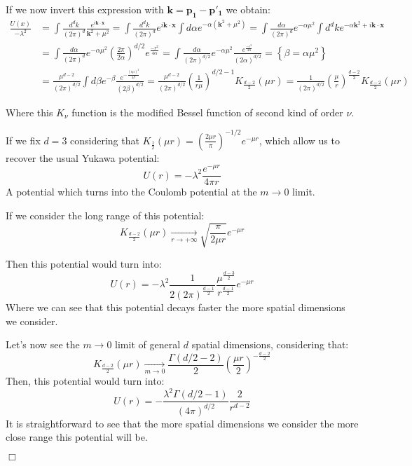 \documentclass[12pt]{article}
\newcommand{\qedwhite}{\hfill \ensuremath{\Box}}
\begin{document}
If we now invert this expression with $\mathbf{k}=\mathbf{p_1}-\mathbf{p'_1}$ we obtain:
\[
    \begin{aligned}
        \frac{U(x)}{-\lambda^2} &= \int \frac{d^dk}{(2\pi)^d}\frac{e^{i\mathbf{k}\cdot\mathbf{x}}}{\mathbf{k}^2+\mu^2} = \int \frac{d^dk}{(2\pi)^d} e^{i\mathbf{k}\cdot\mathbf{x}}\int d\alpha e^{-\alpha(\mathbf{k}^2+\mu^2)} = \int \frac{d\alpha}{(2\pi)^d}e^{-\alpha\mu^2}\int d^dk e^{-\alpha\mathbf{k}^2+i\mathbf{k}\cdot\mathbf{x}} \\
                                &= \int \frac{d\alpha}{(2\pi)^d} e^{-\alpha\mu^2}\left(\frac{2\pi}{2\alpha}\right)^{d/2}e^{\frac{-r^2}{4\alpha}} = \int \frac{d\alpha}{(2\pi)^{d/2}} e^{-\alpha\mu^2}\frac{e^{\frac{-r^2}{4\alpha}}}{(2\alpha)^{d/2}} = \left\{\beta = \alpha\mu^2\right\} \\
                                &= \frac{\mu^{d-2}}{(2\pi)^{d/2}}\int d\beta e^{-\beta}\frac{e^{-\frac{(r\mu)^2}{4\beta}}}{(2\beta)^{d/2}} = \frac{\mu^{d-2}}{(2\pi)^{d/2}} \left(\frac{1}{r\mu}\right)^{d/2-1}K_{\frac{d-2}{2}}(\mu r) = \frac{1}{(2\pi)^{d/2}} \left(\frac{\mu}{r}\right)^{\frac{d-2}{2}}K_{\frac{d-2}{2}}(\mu r)
    \end{aligned}
\]

Where this $K_\nu$ function is the modified Bessel function of second kind of order $\nu$.

\vspace{.25cm}

If we fix $d=3$ considering that $K_{\frac{1}{2}}(\mu r) = \left(\frac{2\mu r}{\pi}\right)^{-1/2}e^{-\mu r}$, which allow us to recover the usual Yukawa potential:
\[
    U(r) = -\lambda^2 \frac{e^{-\mu r}}{4\pi r}
\]
A potential which turns into the Coulomb potential at the $m\rightarrow 0$ limit.

If we consider the long range of this potential:
\[
    K_{\frac{d-2}{2}}(\mu r)\underset{r\rightarrow +\infty}{\longrightarrow}\sqrt{\frac{\pi}{2\mu r}}e^{-\mu r}
\]

Then this potential would turn into:
\[
    U(r)=-\lambda^2\frac{1}{2(2\pi)^{\frac{d-1}{2}}}\frac{\mu^{\frac{d-3}{2}}}{r^{\frac{d-1}{2}}}e^{-\mu r}
\]
Where we can see that this potential decays faster the more spatial dimensions we consider.

Let's now see the $m\rightarrow 0$ limit of general $d$ spatial dimensions, considering that:
\[
    K_{\frac{d-2}{2}}(\mu r)\underset{m\rightarrow 0}{\longrightarrow} \frac{\Gamma\left(d/2-2\right)}{2}\left(\frac{\mu r}{2}\right)^{-\frac{d-2}{2}}
\]
Then, this potential would turn into:
\[
    U(r) = -\frac{\lambda^2\Gamma\left(d/2-1\right)}{(4\pi)^{d/2}}\frac{2}{r^{d-2}}
\]
It is straightforward to see that the more spatial dimensions we consider the more close range this potential will be.

\qedwhite
\end{document}
